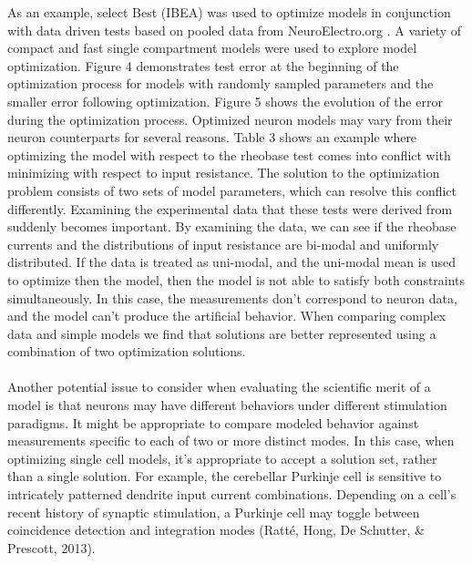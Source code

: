As an example, select Best (IBEA) was used to optimize models in conjunction with data driven tests based on pooled data from NeuroElectro.org \cite{tripathy2014neuroelectro}. A variety of compact and fast single compartment models were used to explore model optimization. Figure 4 demonstrates test error at the beginning of the optimization process for models with randomly sampled parameters and the smaller error following optimization. Figure 5 shows the evolution of the error during the optimization process. \newline
\newline
Optimized neuron models may vary from their neuron counterparts for several reasons. Table 3 shows an example where optimizing the model with respect to the rheobase test comes into conflict with minimizing with respect to input resistance. The solution to the optimization problem consists of two sets of model parameters, which can resolve this conflict differently. Examining the experimental data that these tests were derived from suddenly becomes important. By examining the data, we can see if the rheobase currents and the distributions of input resistance are bi-modal and uniformly distributed. If the data is treated as uni-modal, and the uni-modal mean is used to optimize then the model, then the model is not able to satisfy both constraints simultaneously. In this case, the measurements don’t correspond to neuron data, and the model can’t produce the artificial behavior. When comparing complex data and simple models we find that solutions are better represented using a combination of two optimization solutions.\\
\\
Another potential issue to consider when evaluating the scientific merit of a model is that neurons may have different behaviors under different stimulation paradigms. It might be appropriate to compare modeled behavior against measurements specific to each of two or more distinct modes. In this case, when optimizing single cell models, it’s appropriate to accept a solution set, rather than a single solution. For example, the cerebellar Purkinje cell is sensitive to intricately patterned dendrite input current combinations. Depending on a cell’s recent history of synaptic stimulation, a Purkinje cell may toggle between coincidence detection and integration modes (Ratté, Hong, De Schutter, \& Prescott, 2013).
\\

